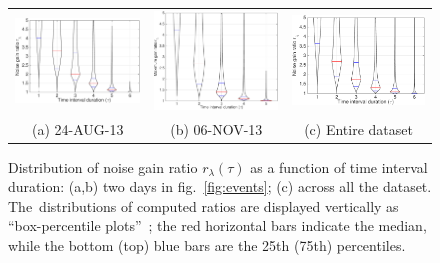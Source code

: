 \begin{figure}
    \footnotesize
    \centering
    \begin{tabular}{ccc}
    \setlength{\tabcolsep}{0pt}
    \includegraphics[width=.30\linewidth]{./figures/relativePerf/20130824-maxGain-global-relativePerf.pdf} & 
    \includegraphics[width=.30\linewidth,height=.202\linewidth]{./figures/relativePerf/20131106-maxGain-global-relativePerf.pdf} & 
    \includegraphics[width=.30\linewidth]{./figures/relativePerf/all-maxGain-relativePerf.pdf} \\
    (a) 24-AUG-13 & (b) 06-NOV-13 & (c) Entire dataset
    \end{tabular}
    \vspace{.15em}
    \caption[Distribution of noise gain ratio in function of interval duration]{Distribution of noise gain ratio $r_\lambda(\tau)$ as a function of time interval duration: (a,b) two days in fig.~\ref{fig:events}; (c) across all the dataset. The~distributions of computed ratios are displayed vertically as ``box-percentile plots''~\cite{esty-jss-03}; the red horizontal bars indicate the median, while the bottom (top) blue bars are the 25th (75th) percentiles. }
    \label{fig:ratios}
\end{figure}

